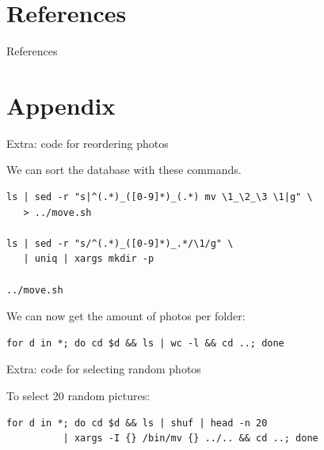 \section{References}

\begin{frame}{References}
    
    
\end{frame}

\section{Appendix}

\begin{frame}[fragile]{Extra: code for reordering photos}

    We can sort the database with these commands.

    \begin{lstlisting}
ls | sed -r "s|^(.*)_([0-9]*)_(.*) mv \1_\2_\3 \1|g" \
   > ../move.sh
    
ls | sed -r "s/^(.*)_([0-9]*)_.*/\1/g" \
   | uniq | xargs mkdir -p
   
../move.sh
    \end{lstlisting}
    
    \medskip

    We can now get the amount of photos per folder:

    \medskip
    
    \begin{lstlisting}
for d in *; do cd $d && ls | wc -l && cd ..; done
    \end{lstlisting}

\end{frame}
\begin{frame}[fragile]{Extra: code for selecting random photos}

    To select 20 random pictures:
    
    \medskip
    
    \begin{lstlisting}
for d in *; do cd $d && ls | shuf | head -n 20 
          | xargs -I {} /bin/mv {} ../.. && cd ..; done
    \end{lstlisting}
\end{frame}

